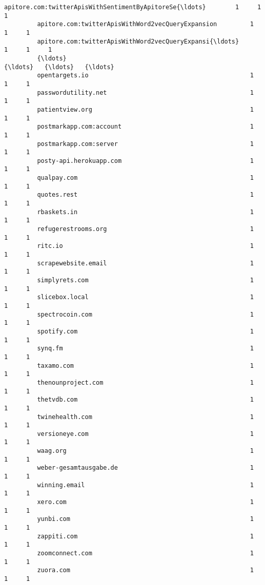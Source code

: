 \documentclass[11pt]{article}
\begin{document}
\begin{Verbatim}[commandchars=\\\{\}]
         apitore.com:twitterApisWithSentimentByApitoreSe{\ldots}        1     1     1   
         apitore.com:twitterApisWithWord2vecQueryExpansion         1     1     1   
         apitore.com:twitterApisWithWord2vecQueryExpansi{\ldots}        1     1     1   
         {\ldots}                                                     {\ldots}   {\ldots}   {\ldots}   
         opentargets.io                                            1     1     1   
         passwordutility.net                                       1     1     1   
         patientview.org                                           1     1     1   
         postmarkapp.com:account                                   1     1     1   
         postmarkapp.com:server                                    1     1     1   
         posty-api.herokuapp.com                                   1     1     1   
         qualpay.com                                               1     1     1   
         quotes.rest                                               1     1     1   
         rbaskets.in                                               1     1     1   
         refugerestrooms.org                                       1     1     1   
         ritc.io                                                   1     1     1   
         scrapewebsite.email                                       1     1     1   
         simplyrets.com                                            1     1     1   
         slicebox.local                                            1     1     1   
         spectrocoin.com                                           1     1     1   
         spotify.com                                               1     1     1   
         synq.fm                                                   1     1     1   
         taxamo.com                                                1     1     1   
         thenounproject.com                                        1     1     1   
         thetvdb.com                                               1     1     1   
         twinehealth.com                                           1     1     1   
         versioneye.com                                            1     1     1   
         waag.org                                                  1     1     1   
         weber-gesamtausgabe.de                                    1     1     1   
         winning.email                                             1     1     1   
         xero.com                                                  1     1     1   
         yunbi.com                                                 1     1     1   
         zappiti.com                                               1     1     1   
         zoomconnect.com                                           1     1     1   
         zuora.com                                                 1     1     1   
         

\end{Verbatim}
\end{document}
